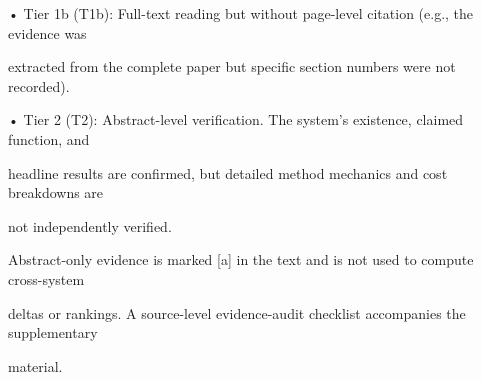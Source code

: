 \begin{flushleft}
\noindent  • Tier 1b (T1b): Full-text reading but without page-level citation (e.g., the evidence was\par
\noindent  extracted from the complete paper but specific section numbers were not recorded).\par
\noindent  • Tier 2 (T2): Abstract-level verification. The system’s existence, claimed function, and\par
\noindent  headline results are confirmed, but detailed method mechanics and cost breakdowns are\par
\noindent  not independently verified.\par
\noindent  Abstract-only evidence is marked [a] in the text and is not used to compute cross-system\par
\noindent deltas or rankings. A source-level evidence-audit checklist accompanies the supplementary\par
\noindent material.\par
\end{flushleft}
